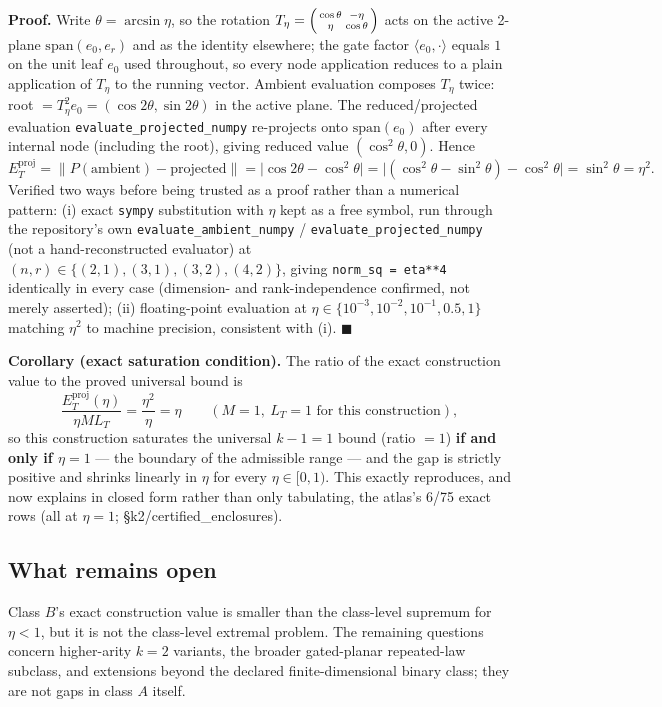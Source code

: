 \textbf{Proof.} Write $\theta=\arcsin\eta$, so the rotation
$T_\eta=\begin{psmallmatrix}\cos\theta&-\eta\\\eta&\cos\theta\end{psmallmatrix}$
acts on the active 2-plane $\mathrm{span}(e_0,e_r)$ and as the identity
elsewhere; the gate factor $\langle e_0,\cdot\rangle$ equals $1$ on the
unit leaf $e_0$ used throughout, so every node application reduces to a
plain application of $T_\eta$ to the running vector. Ambient evaluation
composes $T_\eta$ twice: root $= T_\eta^2 e_0 = (\cos2\theta,\sin2\theta)$
in the active plane. The reduced/projected evaluation
\texttt{evaluate\_projected\_numpy} re-projects onto
$\mathrm{span}(e_0)$ after every internal node (including the root),
giving reduced value $(\cos^2\theta, 0)$. Hence
\[
  E_T^{\mathrm{proj}} = \big\| P(\text{ambient}) - \text{projected}\big\|
  = \big| \cos2\theta - \cos^2\theta \big|
  = \big| (\cos^2\theta-\sin^2\theta) - \cos^2\theta \big|
  = \sin^2\theta = \eta^2.
\]
Verified two ways before being trusted as a proof rather than a
numerical pattern: (i) exact \texttt{sympy} substitution with $\eta$ kept
as a free symbol, run through the repository's own
\texttt{evaluate\_ambient\_numpy} / \texttt{evaluate\_projected\_numpy}
(not a hand-reconstructed evaluator) at $(n,r)\in\{(2,1),(3,1),(3,2),(4,2)\}$,
giving \texttt{norm\_sq = eta**4} identically in every case (dimension-
and rank-independence confirmed, not merely asserted); (ii) floating-point
evaluation at $\eta\in\{10^{-3},10^{-2},10^{-1},0.5,1\}$ matching $\eta^2$
to machine precision, consistent with (i). $\blacksquare$

\textbf{Corollary (exact saturation condition).} The ratio of the exact
construction value to the proved universal bound is
\[
  \frac{E_T^{\mathrm{proj}}(\eta)}{\eta M L_T} = \frac{\eta^2}{\eta} = \eta
  \qquad (M=1,\ L_T=1\text{ for this construction}),
\]
so this construction saturates the universal $k-1=1$ bound
(ratio $=1$) \textbf{if and only if $\eta=1$} — the boundary of the
admissible range — and the gap is strictly positive and shrinks linearly
in $\eta$ for every $\eta\in[0,1)$. This exactly reproduces, and now
explains in closed form rather than only tabulating, the atlas's 6/75
exact rows (all at $\eta=1$; \S k2/certified\_enclosures).

\subsection*{What remains open}

Class $B$'s exact construction value is smaller than the class-level
supremum for $\eta<1$, but it is not the class-level extremal problem.
The remaining questions concern higher-arity $k=2$ variants, the broader
gated-planar repeated-law subclass, and extensions beyond the declared
finite-dimensional binary class; they are not gaps in class $A$ itself.

